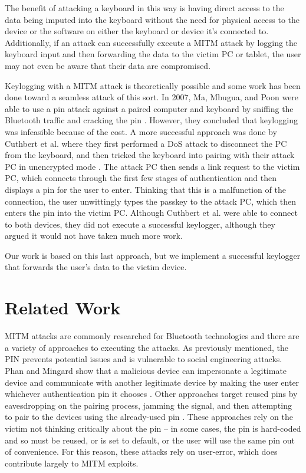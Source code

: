\documentclass{acm_proc_article-sp}
\begin{document}
The benefit of attacking a keyboard in this way is having direct access to the data being imputed into the keyboard without the need for physical access to the device or the software on either the keyboard or device it's connected to. Additionally, if an attack can successfully execute a MITM attack by logging the keyboard input and then forwarding the data to the victim PC or tablet, the user may not even be aware that their data are compromised. 

Keylogging with a MITM attack is theoretically possible and some work has been done toward a seamless attack of this sort. In 2007, Ma, Mbugua, and Poon were able to use a pin attack against a paired computer and keyboard by sniffing the Bluetooth traffic and cracking the pin \cite{ma2007keystroke}. However, they concluded that keylogging was infeasible because of the cost. A more successful approach was done by Cuthbert et al. where they first performed a DoS attack to disconnect the PC from the keyboard, and then tricked the keyboard into pairing with their attack PC in unencrypted mode \cite{cuthbertbluetooth}. The attack PC then sends a link request to the victim PC, which connects through the first few stages of authentication and then displays a pin for the user to enter. Thinking that this is a malfunction of the connection, the user unwittingly types the passkey to the attack PC, which then enters the pin into the victim PC. Although Cuthbert et al. were able to connect to both devices, they did not execute a successful keylogger, although they argued it would not have taken much more work. 

Our work is based on this last approach, but we implement a successful keylogger that forwards the user's data to the victim device.

\section{Related Work}
MITM attacks are commonly researched for Bluetooth technologies and there are a variety of approaches to executing the attacks. As previously mentioned, the PIN prevents potential issues and is vulnerable to social engineering attacks. Phan and Mingard show that a malicious device can impersonate a legitimate device and communicate with another legitimate device by making the user enter whichever authentication pin it chooses \cite{phan2012analyzing}. Other approaches target reused pins by eavesdropping on the pairing process, jamming the signal, and then attempting to pair to the devices using the already-used pin \cite{barnickel2012implementing}. These approaches rely on the victim not thinking critically about the pin -- in some cases, the pin is hard-coded and so must be reused, or is set to default, or the user will use the same pin out of convenience. For this reason, these attacks rely on user-error, which does contribute largely to MITM exploits.  
\end{document}
